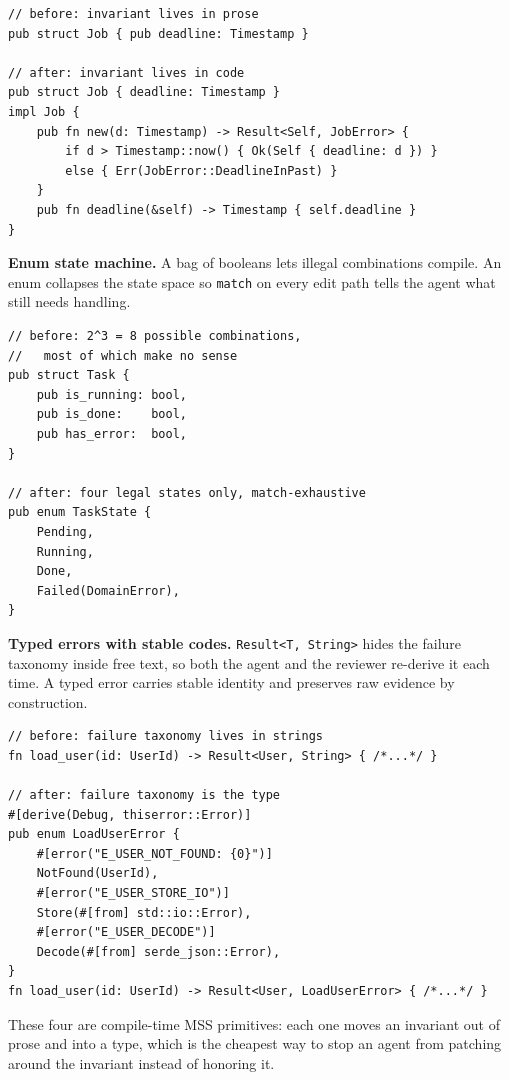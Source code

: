 \documentclass[conference]{IEEEtran}
\newcommand{\mss}{\textnormal{\textsc{MSS}}}
\begin{document}
\begin{lstlisting}[style=rustcode,caption={Validated constructor},label={lst:validated-ctor}]
// before: invariant lives in prose
pub struct Job { pub deadline: Timestamp }

// after: invariant lives in code
pub struct Job { deadline: Timestamp }
impl Job {
    pub fn new(d: Timestamp) -> Result<Self, JobError> {
        if d > Timestamp::now() { Ok(Self { deadline: d }) }
        else { Err(JobError::DeadlineInPast) }
    }
    pub fn deadline(&self) -> Timestamp { self.deadline }
}
\end{lstlisting}

\noindent\textbf{Enum state machine.} A bag of booleans lets illegal combinations compile. An enum collapses the state space so \texttt{match} on every edit path tells the agent what still needs handling.

\begin{lstlisting}[style=rustcode,caption={Enum state machine},label={lst:enum-state}]
// before: 2^3 = 8 possible combinations,
//   most of which make no sense
pub struct Task {
    pub is_running: bool,
    pub is_done:    bool,
    pub has_error:  bool,
}

// after: four legal states only, match-exhaustive
pub enum TaskState {
    Pending,
    Running,
    Done,
    Failed(DomainError),
}
\end{lstlisting}

\noindent\textbf{Typed errors with stable codes.} \texttt{Result<T, String>} hides the failure taxonomy inside free text, so both the agent and the reviewer re-derive it each time. A typed error carries stable identity and preserves raw evidence by construction.

\begin{lstlisting}[style=rustcode,caption={Typed error with stable codes},label={lst:typed-error}]
// before: failure taxonomy lives in strings
fn load_user(id: UserId) -> Result<User, String> { /*...*/ }

// after: failure taxonomy is the type
#[derive(Debug, thiserror::Error)]
pub enum LoadUserError {
    #[error("E_USER_NOT_FOUND: {0}")]
    NotFound(UserId),
    #[error("E_USER_STORE_IO")]
    Store(#[from] std::io::Error),
    #[error("E_USER_DECODE")]
    Decode(#[from] serde_json::Error),
}
fn load_user(id: UserId) -> Result<User, LoadUserError> { /*...*/ }
\end{lstlisting}

These four are compile-time \mss{} primitives: each one moves an invariant out of prose and into a type, which is the cheapest way to stop an agent from patching around the invariant instead of honoring it.
\end{document}
